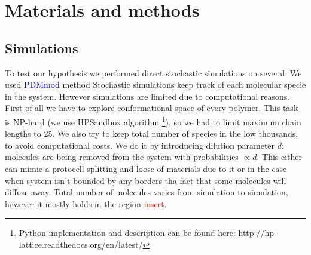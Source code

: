 \documentclass[journal=jacsat,manuscript=article,layout=twocolumn]{achemso}
\newcommand*{\red}[1]{\textcolor{red}{#1}}
\newcommand*{\blue}[1]{\textcolor{blue}{#1}}
\begin{document}
\section{Materials and methods}\label{sec:mat}
\subsection{Simulations}\label{sec:mat-sim}
To test our hypothesis we performed direct stochastic simulations on several. We used 
\blue{PDMmod} method \cite{Bernatskiy}
Stochastic simulations keep track of each 
molecular specie in the system. However simulations are limited due to computational reasons. First 
of all we have to explore conformational space of every polymer. This task is NP-hard (we use 
HPSandbox algorithm\cite{lau1989lattice,Dill2008} \footnote{Python implementation and description 
can be found here: http://hp-lattice.readthedocs.org/en/latest/}), so we had to limit 
maximum chain lengths to 25. We also try to keep total number of species in the low thousands, to 
avoid computational costs. We do it by introducing dilution parameter $d$: molecules are being 
removed from the system with probabilities $\propto d$. 
This either can mimic a protocell splitting and loose of materials due to it or in the case when system isn't bounded by any borders tha fact that some molecules will diffuse away. Total number of molecules varies from simulation to simulation, 
however it mostly holds in the region \red{insert}.
\end{document}
